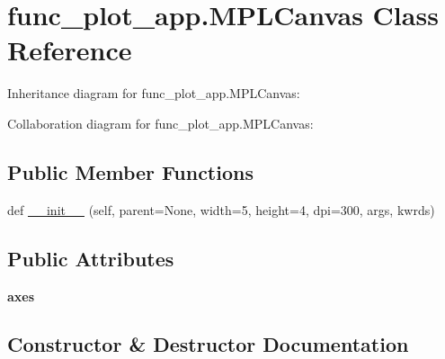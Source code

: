 \hypertarget{classfunc__plot__app_1_1MPLCanvas}{}\section{func\+\_\+plot\+\_\+app.\+M\+P\+L\+Canvas Class Reference}
\label{classfunc__plot__app_1_1MPLCanvas}


Inheritance diagram for func\+\_\+plot\+\_\+app.\+M\+P\+L\+Canvas\+:


Collaboration diagram for func\+\_\+plot\+\_\+app.\+M\+P\+L\+Canvas\+:
\subsection*{Public Member Functions}
\begin{DoxyCompactItemize}
\item 
def \hyperlink{classfunc__plot__app_1_1MPLCanvas_a1fe93f5daf7a578e0561e1229699e110}{\+\_\+\+\_\+init\+\_\+\+\_\+} (self, parent=None, width=5, height=4, dpi=300, args, kwrds)
\end{DoxyCompactItemize}
\subsection*{Public Attributes}
\begin{DoxyCompactItemize}
\item 
\mbox{\label{classfunc__plot__app_1_1MPLCanvas_a20600d3141312675b3288019bb8bda54}} 
{\bfseries axes}
\end{DoxyCompactItemize}


\subsection{Constructor \& Destructor Documentation}
\mbox{\label{classfunc__plot__app_1_1MPLCanvas_a1fe93f5daf7a578e0561e1229699e110}} 
